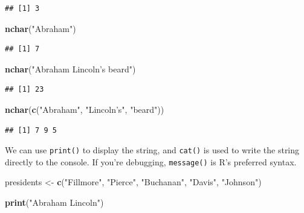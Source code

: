 \documentclass[
]{book}
\newenvironment{Shaded}{\begin{snugshade}}{\end{snugshade}}
\newcommand{\KeywordTok}[1]{\textcolor[rgb]{0.13,0.29,0.53}{\textbf{#1}}}
\newcommand{\NormalTok}[1]{#1}
\newcommand{\StringTok}[1]{\textcolor[rgb]{0.31,0.60,0.02}{#1}}
\begin{document}
\begin{verbatim}
## [1] 3
\end{verbatim}

\begin{Shaded}
\begin{Highlighting}[]
\KeywordTok{nchar}\NormalTok{(}\StringTok{"Abraham"}\NormalTok{)}
\end{Highlighting}
\end{Shaded}

\begin{verbatim}
## [1] 7
\end{verbatim}

\begin{Shaded}
\begin{Highlighting}[]
\KeywordTok{nchar}\NormalTok{(}\StringTok{"Abraham Lincoln's beard"}\NormalTok{)}
\end{Highlighting}
\end{Shaded}

\begin{verbatim}
## [1] 23
\end{verbatim}

\begin{Shaded}
\begin{Highlighting}[]
\KeywordTok{nchar}\NormalTok{(}\KeywordTok{c}\NormalTok{(}\StringTok{"Abraham"}\NormalTok{, }\StringTok{"Lincoln's"}\NormalTok{, }\StringTok{"beard"}\NormalTok{))}
\end{Highlighting}
\end{Shaded}

\begin{verbatim}
## [1] 7 9 5
\end{verbatim}

We can use \texttt{print()} to display the string, and \texttt{cat()} is used to write the string directly to the console. If you're debugging, \texttt{message()} is R's preferred syntax.

\begin{Shaded}
\begin{Highlighting}[]
\NormalTok{presidents <-}\StringTok{ }\KeywordTok{c}\NormalTok{(}\StringTok{"Fillmore"}\NormalTok{, }\StringTok{"Pierce"}\NormalTok{, }\StringTok{"Buchanan"}\NormalTok{, }\StringTok{"Davis"}\NormalTok{, }\StringTok{"Johnson"}\NormalTok{)}

\KeywordTok{print}\NormalTok{(}\StringTok{"Abraham Lincoln"}\NormalTok{)}
\end{Highlighting}
\end{Shaded}
\end{document}
